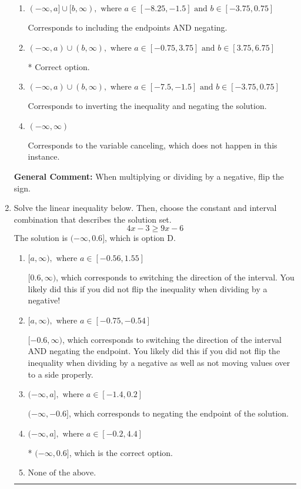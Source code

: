 \documentclass{extbook}[14pt]
\newcommand{\litem}[1]{\item #1

\rule{\textwidth}{0.4pt}}
\begin{document}
\begin{enumerate}
{\begin{enumerate}[label=\Alph*.]
Corresponds to including the endpoints (when they should be excluded).
\item \( (-\infty, a] \cup [b, \infty), \text{ where } a \in [-8.25, -1.5] \text{ and } b \in [-3.75, 0.75] \)

Corresponds to including the endpoints AND negating.
\item \( (-\infty, a) \cup (b, \infty), \text{ where } a \in [-0.75, 3.75] \text{ and } b \in [3.75, 6.75] \)

 * Correct option.
\item \( (-\infty, a) \cup (b, \infty), \text{ where } a \in [-7.5, -1.5] \text{ and } b \in [-3.75, 0.75] \)

Corresponds to inverting the inequality and negating the solution.
\item \( (-\infty, \infty) \)

Corresponds to the variable canceling, which does not happen in this instance.
\end{enumerate}

\textbf{General Comment:} When multiplying or dividing by a negative, flip the sign.
}
\litem{
Solve the linear inequality below. Then, choose the constant and interval combination that describes the solution set.
\[ 4x -3 \geq 9x -6 \]The solution is \( (-\infty, 0.6] \), which is option D.\begin{enumerate}[label=\Alph*.]
\item \( [a, \infty), \text{ where } a \in [-0.56, 1.55] \)

 $[0.6, \infty)$, which corresponds to switching the direction of the interval. You likely did this if you did not flip the inequality when dividing by a negative!
\item \( [a, \infty), \text{ where } a \in [-0.75, -0.54] \)

 $[-0.6, \infty)$, which corresponds to switching the direction of the interval AND negating the endpoint. You likely did this if you did not flip the inequality when dividing by a negative as well as not moving values over to a side properly.
\item \( (-\infty, a], \text{ where } a \in [-1.4, 0.2] \)

 $(-\infty, -0.6]$, which corresponds to negating the endpoint of the solution.
\item \( (-\infty, a], \text{ where } a \in [-0.2, 4.4] \)

* $(-\infty, 0.6]$, which is the correct option.
\item \( \text{None of the above}. \)


\end{enumerate}}
\end{enumerate}
\end{document}
